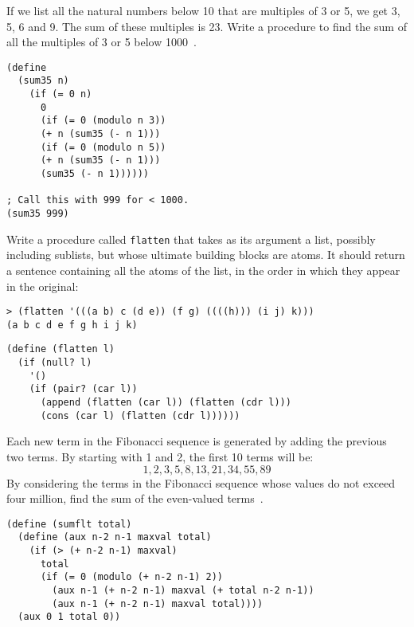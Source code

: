 \documentclass[addpoints,12pt,a4paper]{exam}
\begin{document}
\begin{questions}
\question
If we list all the natural numbers below 10 that are multiples of 3 or 5, we get 3, 5, 6 and 9.
The sum of these multiples is 23.
Write a procedure to find the sum of all the multiples of 3 or 5 below 1000~\cite{projecteuler}.

\begin{solution}
  \begin{verbatim}
(define 
  (sum35 n)
    (if (= 0 n)
      0
      (if (= 0 (modulo n 3))
      (+ n (sum35 (- n 1)))
      (if (= 0 (modulo n 5))
      (+ n (sum35 (- n 1)))
      (sum35 (- n 1))))))

; Call this with 999 for < 1000.
(sum35 999)
  \end{verbatim}
\end{solution}

\question
Write a procedure called \texttt{flatten} that takes as its argument a list, possibly including sublists, but whose ultimate building blocks are atoms.
It should return a sentence containing all the atoms of the list, in the order in which they appear in the original:
\begin{verbatim}
> (flatten '(((a b) c (d e)) (f g) ((((h))) (i j) k)))
(a b c d e f g h i j k)
\end{verbatim}

\begin{solution}
  \begin{verbatim}
(define (flatten l)
  (if (null? l)
    '()
    (if (pair? (car l))
      (append (flatten (car l)) (flatten (cdr l)))
      (cons (car l) (flatten (cdr l))))))
  \end{verbatim}
\end{solution}

\question
Each new term in the Fibonacci sequence is generated by adding the previous two terms.
By starting with 1 and 2, the first 10 terms will be:
\[ 1, 2, 3, 5, 8, 13, 21, 34, 55, 89 \]
By considering the terms in the Fibonacci sequence whose values do not exceed four million, find the sum of the even-valued terms~\cite{projecteuler}.

\begin{solution}
  \begin{verbatim}
(define (sumflt total)
  (define (aux n-2 n-1 maxval total)
    (if (> (+ n-2 n-1) maxval)
      total
      (if (= 0 (modulo (+ n-2 n-1) 2))
        (aux n-1 (+ n-2 n-1) maxval (+ total n-2 n-1))
        (aux n-1 (+ n-2 n-1) maxval total))))
  (aux 0 1 total 0))
  \end{verbatim}
\end{solution}


\end{questions}
\end{document}
